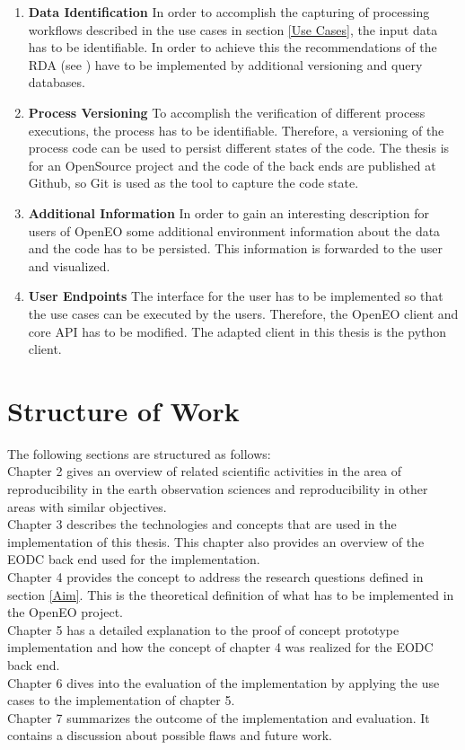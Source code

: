 \documentclass[draft,final]{vutinfth} %
\begin{document}
\begin{enumerate}
	\item \textbf{Data Identification}
	In order to accomplish the capturing of processing workflows described in the use cases in section \ref{Use Cases}, the input data has to be identifiable. In order to achieve this the recommendations of the RDA (see \cite{Rauber2016IdentificationOR}) have to be implemented by additional versioning and query databases. 
	
	\item \textbf{Process Versioning}
	To accomplish the verification of different process executions, the process has to be identifiable. Therefore, a versioning of the process code can be used to persist different states of the code. The thesis is for an OpenSource project and the code of the back ends are published at Github, so Git is used as the tool to capture the code state. 
	
	\item \textbf{Additional Information}
	In order to gain an interesting description for users of OpenEO some additional environment information about the data and the code has to be persisted. This information is forwarded to the user and visualized.   
	
	\item \textbf{User Endpoints}
	The interface for the user has to be implemented so that the use cases can be executed by the users. Therefore, the OpenEO client and core API has to be modified. The adapted client in this thesis is the python client. 
\end{enumerate}

\section{Structure of Work}\label{Structure}
The following sections are structured as follows:\\
Chapter 2 gives an overview of related scientific activities in the area of reproducibility in the earth observation sciences and reproducibility in other areas with similar objectives.\\
Chapter 3  describes the technologies and concepts that are used in the implementation of this thesis. This chapter also provides an overview of the EODC back end used for the implementation.\\
Chapter 4 provides the concept to address the research questions defined in section \ref{Aim}.  This is the theoretical definition of what has to be implemented in the OpenEO project.\\
Chapter 5 has a detailed explanation to the proof of concept prototype implementation and how the concept of chapter 4 was realized for the EODC back end. \\
Chapter 6 dives into the evaluation of the implementation by applying the use cases to the implementation of chapter 5.\\
Chapter 7 summarizes the outcome of the implementation and evaluation. It contains a discussion about possible flaws and future work. \\
\end{document}
